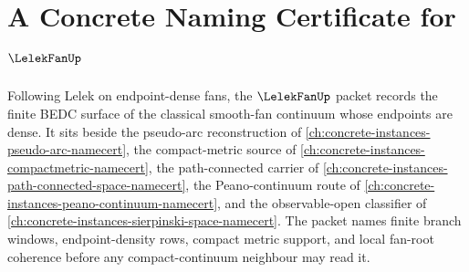 \chapter{A Concrete Naming Certificate for $\LelekFanUp$}
\label{ch:concrete-instances-lelek-fan-namecert}

Following Lelek on endpoint-dense fans, the $\LelekFanUp$ packet records the finite BEDC surface of the classical smooth-fan continuum whose endpoints are dense. It sits beside the pseudo-arc reconstruction of \autoref{ch:concrete-instances-pseudo-arc-namecert}, the compact-metric source of \autoref{ch:concrete-instances-compactmetric-namecert}, the path-connected carrier of \autoref{ch:concrete-instances-path-connected-space-namecert}, the Peano-continuum route of \autoref{ch:concrete-instances-peano-continuum-namecert}, and the observable-open classifier of \autoref{ch:concrete-instances-sierpinski-space-namecert}. The packet names finite branch windows, endpoint-density rows, compact metric support, and local fan-root coherence before any compact-continuum neighbour may read it.

